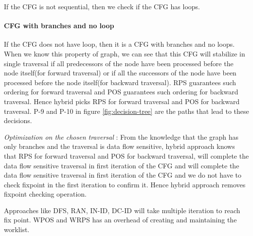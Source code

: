 If the CFG is not sequential, then we check if the CFG has loops.
\paragraph{CFG with branches and no loop} \label{sec:decision-ds-br}
If the CFG does not have loop, then it is a CFG with branches and no loops. When
we know this property of graph, we can see that this CFG will stabilize in
single traversal if all predecessors of the node have been processed before the
node itself(for forward traversal) or if all the successors of the node have
been processed before the node itself(for backward traversal). RPS guarantees
such ordering for forward traversal and POS guarantees such ordering for
backward traversal. Hence hybrid picks RPS for forward traversal and POS for
backward traversal. P-9 and P-10 in figure \ref{fig:decision-tree} are the paths
that lead to these decisions.\par \textit{Optimization on the chosen traversal}
: From the knowledge that the graph has only branches and the traversal is data
flow sensitive, hybrid approach knows that RPS for forward traversal and POS for
backward traversal, will complete the data flow sensitive traversal in first
iteration of the CFG and will complete the data flow sensitive traversal in
first iteration of the CFG and we do not have to check fixpoint in the first
iteration to confirm it. Hence hybrid approach removes fixpoint checking
operation.\par Approaches like DFS, RAN, IN-ID, DC-ID will take multiple
iteration to reach fix point. WPOS and WRPS has an overhead of creating and
maintaining the worklist.

